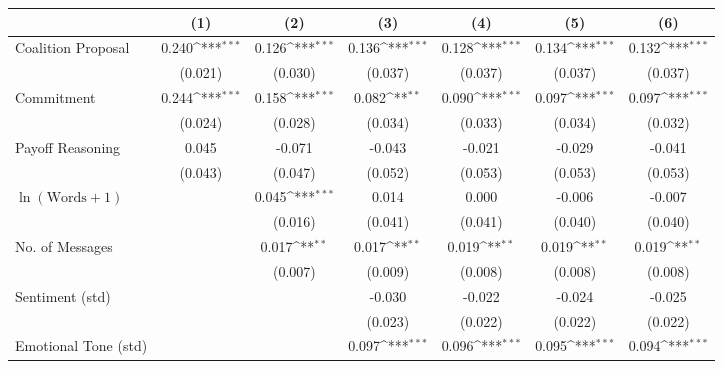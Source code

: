 \renewcommand{\arraystretch}{0.85}
\def\sym#1{\ifmmode^{#1}\else\(^{#1}\)\fi}
\begin{tabular}{lcccccc}
\toprule
                &\multicolumn{1}{c}{(1)}         &\multicolumn{1}{c}{(2)}         &\multicolumn{1}{c}{(3)}         &\multicolumn{1}{c}{(4)}         &\multicolumn{1}{c}{(5)}         &\multicolumn{1}{c}{(6)}         \\
\midrule
Coalition Proposal&    0.240\sym{***}&    0.126\sym{***}&    0.136\sym{***}&    0.128\sym{***}&    0.134\sym{***}&    0.132\sym{***}\\
                &  (0.021)         &  (0.030)         &  (0.037)         &  (0.037)         &  (0.037)         &  (0.037)         \\
Commitment      &    0.244\sym{***}&    0.158\sym{***}&    0.082\sym{**} &    0.090\sym{***}&    0.097\sym{***}&    0.097\sym{***}\\
                &  (0.024)         &  (0.028)         &  (0.034)         &  (0.033)         &  (0.034)         &  (0.032)         \\
Payoff Reasoning&    0.045         &   -0.071         &   -0.043         &   -0.021         &   -0.029         &   -0.041         \\
                &  (0.043)         &  (0.047)         &  (0.052)         &  (0.053)         &  (0.053)         &  (0.053)         \\
$\ln(\text{Words} + 1)$&                  &    0.045\sym{***}&    0.014         &    0.000         &   -0.006         &   -0.007         \\
                &                  &  (0.016)         &  (0.041)         &  (0.041)         &  (0.040)         &  (0.040)         \\
No. of Messages &                  &    0.017\sym{**} &    0.017\sym{**} &    0.019\sym{**} &    0.019\sym{**} &    0.019\sym{**} \\
                &                  &  (0.007)         &  (0.009)         &  (0.008)         &  (0.008)         &  (0.008)         \\
Sentiment (std) &                  &                  &   -0.030         &   -0.022         &   -0.024         &   -0.025         \\
                &                  &                  &  (0.023)         &  (0.022)         &  (0.022)         &  (0.022)         \\
Emotional Tone (std)&                  &                  &    0.097\sym{***}&    0.096\sym{***}&    0.095\sym{***}&    0.094\sym{***}\\

\end{tabular}
